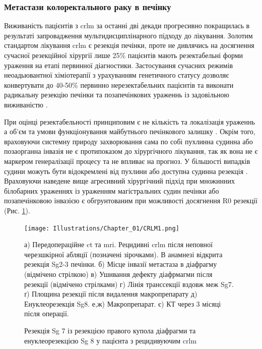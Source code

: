 \subsubsection{Метастази колоректального раку в печінку}

Виживаність пацієнтів з \acrshort{crlm} за останні дві декади прогресивно покращилась в результаті запровадження мультидисциплінарного підходу до лікування. Золотим стандартом лікування \acrshort{crlm} є резекція печінки, проте не дивлячись на досягнення сучасної резекційної хірургії лише 25\% пацієнтів мають резектабельні форми ураження на етапі первинної діагностики. Застосування сучасних режимів неоадьювантної хіміотерапії з урахуванням генетичного статусу дозволяє конвертувати до 40-50\% первинно нерезектабельних пацієнтів та виконати радикальну резекцію печінки та позапечінкових ураженнь із задовільною виживаністю \cite{Adam2019a}. 

При оцінці резектабельності принциповим є не кількість та локалізація ураженнь а об'єм та умови функціонування майбутнього печінкового залишку \cite{Allard2017}. Окрім того, враховуючи системну природу захворювання сама по собі пухлинна судинна або позаорганна інвазія не є протипоказом до хірургічного лікування, так як вона не є маркером генералізації процесу та не впливає на прогноз. У більшості випадків судини можуть бути відокремлені від пухлини або доступна судинна резекція \cite{Torzilli2017}. Враховуючи наведене вище агресивний хірургічний підхід при множинних білобарних ураженнях із ураженням магістральних судин печінки або позапечінковою інвазією є обгрунтованим при можливості досягнення R0 резекції (Рис. \ref{fig:CRLM1}).

\begin{figure}[!ht]
\caption{Резекція Sg 7 із резекцією правого купола діафрагми та енуклеорезекцією Sg 8 у пацієнта з рецидивуючим \acrshort{crlm}}

\texttt{[image: Illustrations/Chapter\_01/CRLM1.png]}
\label{fig:CRLM1}

\medskip
\small
а) Передопераційне \acrshort{ct} та \acrshort{mri}. Рецидивні \acrshort{crlm} після неповної черезшкірної абляції (позначені зірочками). В анамнезі відкрита резекція Sg2-3 печінки. б) Місце інвазії метастаза в діафрагму (відмічено стрілкою)  в) Ушивання дефекту діафрмагми після резекції (відмічено стрілками)  г) Лінія транссекції вздовж меж Sg7. ґ) Площина резекції після видалення макропрепарату д) Енуклеорезекція Sg8. е,ж) Макропрепарат. є) КТ через 3 місяці після операції.

\end{figure}


